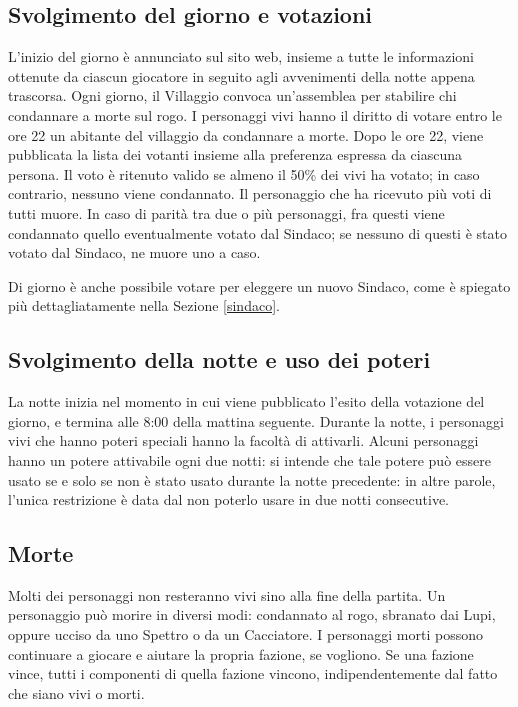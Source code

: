 \documentclass[a4paper,10pt]{article}
\begin{document}
\subsection{Svolgimento del giorno e votazioni}

L'inizio del giorno è annunciato sul sito web, insieme a tutte le informazioni ottenute da ciascun giocatore in seguito agli avvenimenti della notte appena trascorsa.
Ogni giorno, il Villaggio convoca un'assemblea per stabilire chi condannare a morte sul rogo.
I personaggi vivi hanno il diritto di votare entro le ore 22 un abitante del villaggio da condannare a morte. Dopo le ore 22, viene pubblicata la lista dei votanti insieme alla preferenza espressa da ciascuna persona.
Il voto è ritenuto valido se almeno il 50\% dei vivi ha votato; in caso contrario, nessuno viene condannato. Il personaggio che ha ricevuto più voti di tutti muore.
In caso di parità tra due o più personaggi, fra questi viene condannato quello eventualmente votato dal Sindaco; se nessuno di questi è stato votato dal Sindaco, ne muore uno a caso.

Di giorno è anche possibile votare per eleggere un nuovo Sindaco, come è spiegato più dettagliatamente nella Sezione \ref{sindaco}.


\subsection{Svolgimento della notte e uso dei poteri}

La notte inizia nel momento in cui viene pubblicato l'esito della votazione del giorno, e termina alle 8:00 della mattina seguente.
Durante la notte, i personaggi vivi che hanno poteri speciali hanno la facoltà di attivarli.
Alcuni personaggi hanno un potere attivabile ogni due notti: si intende che tale potere può essere usato se e solo se non è stato usato durante la notte precedente: in altre parole, l'unica restrizione è data dal non poterlo usare in due notti consecutive.

\subsection{Morte}

Molti dei personaggi non resteranno vivi sino alla fine della partita. Un personaggio può morire in diversi modi: condannato al rogo, sbranato dai Lupi, oppure ucciso da uno Spettro o da un Cacciatore.
I personaggi morti possono continuare a giocare e aiutare la propria fazione, se vogliono. Se una fazione vince, tutti i componenti di quella fazione vincono, indipendentemente dal fatto che siano vivi o morti.
\end{document}
